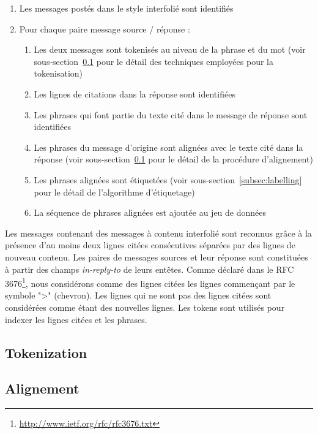\begin{enumerate}
    \item Les messages postés dans le style interfolié sont identifiés
    \item Pour chaque paire message source / réponse :
    \begin{enumerate}
        \item Les deux messages sont tokenisés au niveau de la phrase et du mot (voir sous-section~\ref{subsec:tokenization} pour le détail des techniques employées pour la tokenisation)
        \item Les lignes de citations dans la réponse sont identifiées
        \item Les phrases qui font partie du texte cité dans le message de réponse sont identifiées
        \item Les phrases du message d'origine sont alignées avec le texte cité dans la réponse (voir sous-section~\ref{subsec:tokenization} pour le détail de la procédure d'alignement)
        \item Les phrases alignées sont étiquetées (voir sous-section~\ref{subsec:labelling} pour le détail de l'algorithme d'étiquetage)
        \item La séquence de phrases alignées est ajoutée au jeu de données
    \end{enumerate}
\end{enumerate}

Les messages contenant des messages à contenu interfolié sont reconnus grâce à la présence d'au moins deux lignes citées consécutives séparées par des lignes de nouveau contenu. Les paires de messages sources et leur réponse sont constituées à partir des champs \emph{in-reply-to} de leurs entêtes. Comme déclaré dans le RFC 3676\footnote{\url{http://www.ietf.org/rfc/rfc3676.txt}}, nous considérons comme des lignes citées les lignes commençant par le symbole "\textgreater" (chevron). Les lignes qui ne sont pas des lignes citées sont considérées comme étant des nouvelles lignes. Les tokens sont utilisés pour indexer les lignes citées et les phrases.

\subsection{Tokenization}

\label{subsec:tokenization}

\subsection{Alignement}

